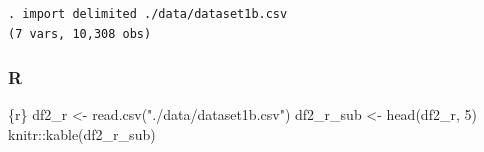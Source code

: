 \documentclass[
  letterpaper,
  DIV=11,
  numbers=noendperiod,
  oneside]{scrreprt}
\newenvironment{Shaded}{\begin{snugshade}}{\end{snugshade}}
\newcommand{\DecValTok}[1]{\textcolor[rgb]{0.68,0.00,0.00}{#1}}
\newcommand{\FunctionTok}[1]{\textcolor[rgb]{0.28,0.35,0.67}{#1}}
\newcommand{\InformationTok}[1]{\textcolor[rgb]{0.37,0.37,0.37}{#1}}
\newcommand{\NormalTok}[1]{\textcolor[rgb]{0.00,0.23,0.31}{#1}}
\newcommand{\OtherTok}[1]{\textcolor[rgb]{0.00,0.23,0.31}{#1}}
\newcommand{\SpecialCharTok}[1]{\textcolor[rgb]{0.37,0.37,0.37}{#1}}
\newcommand{\StringTok}[1]{\textcolor[rgb]{0.13,0.47,0.30}{#1}}
\begin{document}
\begin{verbatim}
. import delimited ./data/dataset1b.csv
(7 vars, 10,308 obs)
\end{verbatim}

\hypertarget{r-1}{%
\subsubsection{R}\label{r-1}}

\begin{Shaded}
\begin{Highlighting}[]
\InformationTok{\textasciigrave{}\textasciigrave{}\textasciigrave{}\{r\}}
\NormalTok{df2\_r }\OtherTok{\textless{}{-}} \FunctionTok{read.csv}\NormalTok{(}\StringTok{"./data/dataset1b.csv"}\NormalTok{)}
\NormalTok{df2\_r\_sub }\OtherTok{\textless{}{-}} \FunctionTok{head}\NormalTok{(df2\_r, }\DecValTok{5}\NormalTok{)}
\NormalTok{knitr}\SpecialCharTok{::}\FunctionTok{kable}\NormalTok{(df2\_r\_sub)}
\InformationTok{\textasciigrave{}\textasciigrave{}\textasciigrave{}}
\end{Highlighting}
\end{Shaded}
\end{document}
